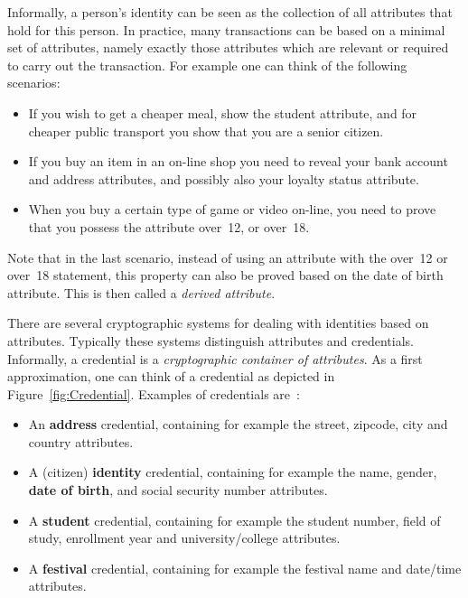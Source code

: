 Informally, a person's identity can be seen as the collection
of all attributes that hold for this person. In practice, many
transactions can be based on a minimal set of attributes, namely exactly those
attributes which are relevant or required to carry out the transaction. For
example one can think of the following scenarios:
\begin{itemize}
  \item If you wish to get a cheaper meal, show the \textsf{student} attribute,
    and for cheaper public transport you show that you are a \textsf{senior
    citizen}.
  \item If you buy an item in an on-line shop you need to reveal your
    \textsf{bank account} and \textsf{address} attributes, and possibly also
    your \textsf{loyalty status} attribute.
  \item When you buy a certain type of game or video on-line, you need to
    prove that you possess the attribute \textsf{over~12}, or \textsf{over~18}.
\end{itemize}
Note that in the last scenario, instead of using an attribute with the
\textsf{over~12} or \textsf{over~18} statement,
 this property can also be proved
based on the \textsf{date of birth} attribute. This is then called a
\emph{derived attribute}.

There are several cryptographic systems for dealing with identities
 based on attributes. Typically these systems
distinguish attributes and credentials. Informally, a credential
 is a \emph{cryptographic container  of attributes}. As a first approximation, one can think of a
credential as depicted in Figure~\ref{fig:Credential}. Examples of credentials
are~\cite{AlparJacobs2013}:
\begin{itemize}
  \item An \textbf{address} credential, containing for example the 
    \textsf{street}, \textsf{zipcode}, \textsf{city} and \textsf{country} 
    attributes.
  \item A (citizen) \textbf{identity} credential, containing for example the 
    \textsf{name}, \textsf{gender}, \textbf{date of birth}, and \textsf{social
    security number} attributes.
  \item A \textbf{student} credential, containing for example the 
    \textsf{student number}, \textsf{field of study}, \textsf{enrollment year} 
    and \textsf{university/college} attributes.
  \item A \textbf{festival} credential, containing for example the \textsf{festival name} and \textsf{date/time} attributes.
\end{itemize}

